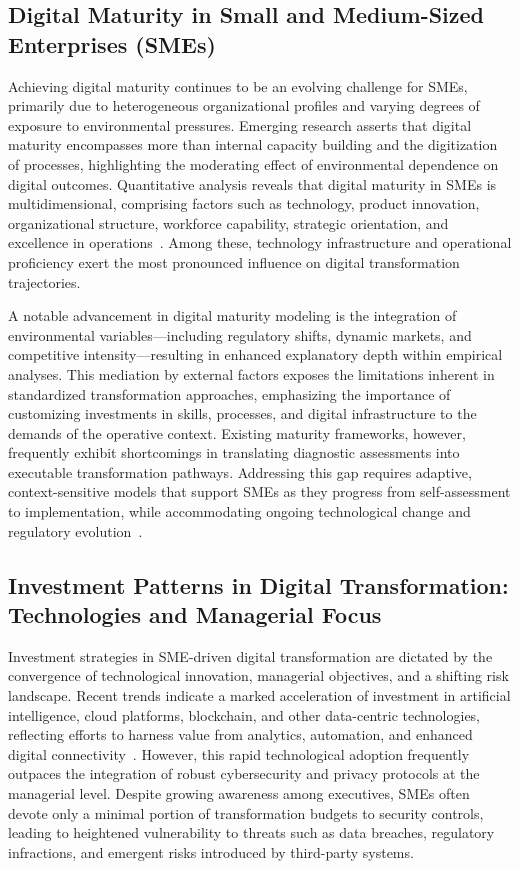 \subsection{Digital Maturity in Small and Medium-Sized Enterprises (SMEs)}

Achieving digital maturity continues to be an evolving challenge for SMEs, primarily due to heterogeneous organizational profiles and varying degrees of exposure to environmental pressures. Emerging research asserts that digital maturity encompasses more than internal capacity building and the digitization of processes, highlighting the moderating effect of environmental dependence on digital outcomes. Quantitative analysis reveals that digital maturity in SMEs is multidimensional, comprising factors such as technology, product innovation, organizational structure, workforce capability, strategic orientation, and excellence in operations~\cite{ref34}. Among these, technology infrastructure and operational proficiency exert the most pronounced influence on digital transformation trajectories.

A notable advancement in digital maturity modeling is the integration of environmental variables—including regulatory shifts, dynamic markets, and competitive intensity—resulting in enhanced explanatory depth within empirical analyses. This mediation by external factors exposes the limitations inherent in standardized transformation approaches, emphasizing the importance of customizing investments in skills, processes, and digital infrastructure to the demands of the operative context. Existing maturity frameworks, however, frequently exhibit shortcomings in translating diagnostic assessments into executable transformation pathways. Addressing this gap requires adaptive, context-sensitive models that support SMEs as they progress from self-assessment to implementation, while accommodating ongoing technological change and regulatory evolution~\cite{ref34}.

\subsection{Investment Patterns in Digital Transformation: Technologies and Managerial Focus}

Investment strategies in SME-driven digital transformation are dictated by the convergence of technological innovation, managerial objectives, and a shifting risk landscape. Recent trends indicate a marked acceleration of investment in artificial intelligence, cloud platforms, blockchain, and other data-centric technologies, reflecting efforts to harness value from analytics, automation, and enhanced digital connectivity~\cite{ref35}. However, this rapid technological adoption frequently outpaces the integration of robust cybersecurity and privacy protocols at the managerial level. Despite growing awareness among executives, SMEs often devote only a minimal portion of transformation budgets to security controls, leading to heightened vulnerability to threats such as data breaches, regulatory infractions, and emergent risks introduced by third-party systems.

